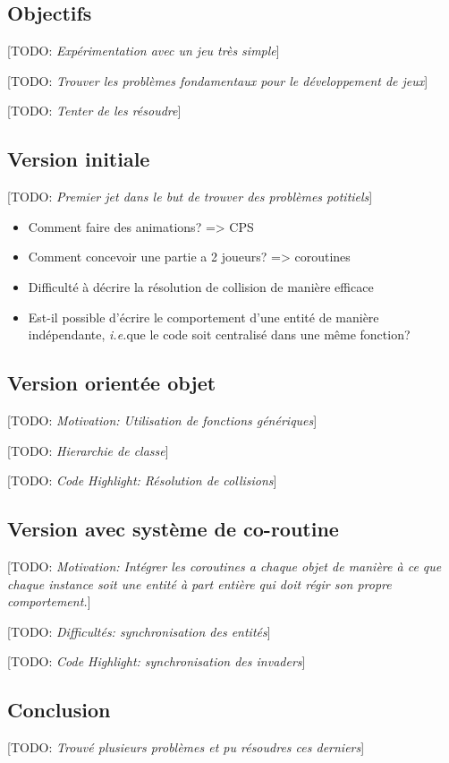 \documentclass[12pt,oneside,letterpaper,francais]{book}
\newcommand{\todo}[1]{[TODO: {\it #1}]}
\newcommand{\ie}{{\textit{i.e.}}}
\begin{document}
\subsection{Objectifs}
\todo{Expérimentation avec un jeu très simple}

\todo{Trouver les problèmes fondamentaux pour le développement de jeux}

\todo{Tenter de les résoudre}

\subsection{Version initiale}
\todo{Premier jet dans le but de trouver des problèmes potitiels}

\begin{itemize}
\item Comment faire des animations? => CPS
\item Comment concevoir une partie a 2 joueurs? => coroutines
\item Difficulté à décrire la résolution de collision de manière
  efficace 
\item Est-il possible d'écrire le comportement d'une entité de manière
  indépendante, \ie que le code soit centralisé dans une même
  fonction?
\end{itemize}

\subsection{Version orientée objet}
\todo{Motivation: Utilisation de fonctions génériques}

\todo{Hierarchie de classe}

\todo{Code Highlight: Résolution de collisions}


\subsection{Version avec système de co-routine}
\todo{Motivation: Intégrer les coroutines a chaque objet de manière à
  ce que chaque instance soit une entité à part entière qui doit régir
  son propre comportement.}

\todo{Difficultés: synchronisation des entités}

\todo{Code Highlight: synchronisation des invaders}


\subsection{Conclusion}
\todo{Trouvé plusieurs problèmes et pu résoudres ces derniers}
\end{document}
